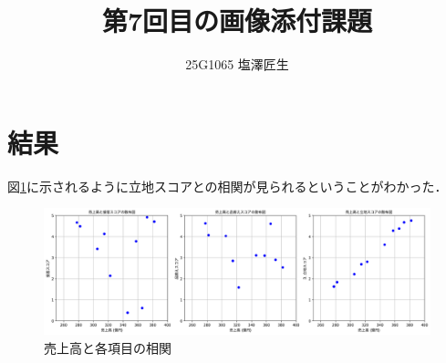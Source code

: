 \documentclass[uplatex]{jsarticle}
\begin{document}
\title{第7回目の画像添付課題}
\author{25G1065 塩澤匠生}
\maketitle




\section{結果}
図\ref{fig:correlation}に示されるように立地スコアとの相関が見られるということがわかった．


\begin{figure}[H]
    \centering
    \includegraphics[width=1\textwidth]{graph/g.png}
    \caption{売上高と各項目の相関}
    \label{fig:correlation}
\end{figure}
\end{document}
